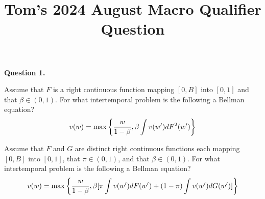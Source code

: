 \documentclass{article} %
\begin{document}
\date{}
\title{Tom's 2024 August Macro Qualifier Question}

\maketitle
\noindent
 \textbf{Question 1.} 

\medskip


  Assume that  $F$ is a right continuous function mapping $[0, B]$ into $[0,1]$ and that $\beta \in (0,1)$. For what intertemporal problem is the following a Bellman equation?
$$ v(w) = \max\left\{ {w\over{1-\beta}},  \beta \int v(w') d F^2(w') \right\} $$

\medskip

\medskip



  Assume that  $F$ and $G$ are distinct  right continuous functions each mapping $[0, B]$ into $[0,1]$, that $\pi \in (0,1)$, and  that $\beta \in (0,1)$. For what intertemporal problem is the following a Bellman equation?
$$ v(w) = \max\left\{ {w\over{1-\beta}},  \beta [  \pi \int v(w') d F(w') + (1-\pi) \int v(w') d G(w') ]  \right\} $$
\end{document}
